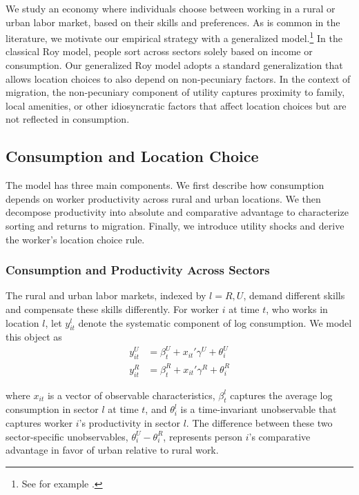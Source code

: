 \documentclass[12pt]{article}
\begin{document}
We study an economy where individuals choose between working in a rural or urban labor market, based on their skills and preferences. 
As is common in the literature, we motivate our empirical strategy with a generalized \cite{royThoughtsDistributionEarnings1951} model.\footnote{See for example \citealt{bazziSkillTransferabilityMigration2016, alvarezAgriculturalWageGap2020, lagakosSelectionAgricultureCrossCountry2013,pulidoBarriersMobilitySorting2021}.} 
In the classical Roy model, people sort across sectors solely based on income or consumption.
Our generalized Roy model adopts a standard generalization that allows location choices to also depend on non-pecuniary factors. 
In the context of migration, the non-pecuniary component of utility captures proximity to family, local amenities, or other idiosyncratic factors that affect location choices but are not reflected in consumption.

\subsection{Consumption and Location Choice}\label{location-choice-model}

The model has three main components.
We first describe how consumption depends on worker productivity across rural and urban locations.
We then decompose productivity into absolute and comparative advantage to characterize sorting and returns to migration.
Finally, we introduce utility shocks and derive the worker’s location choice rule.


\subsubsection{Consumption and Productivity Across Sectors}

The rural and urban labor markets, indexed by $l=R,U$, demand different skills and compensate these skills differently. 
For worker $i$ at time $t$, who works in location $l$, let $y_{it}^l$ denote the systematic component of log consumption.
We model this object as
\begin{align}
    y_{it}^{U}&=\beta_t^U+x_{it}'\gamma^U+\theta_i^U \label{eq:y_it_U}\\
    y_{it}^{R}&=\beta_t^R+x_{it}'\gamma^R+\theta_i^R \label{eq:y_it_R}
\end{align}

\noindent where $x_{i t}$ is a vector of observable characteristics, $\beta^{l}_{t}$ captures the average log consumption in sector $l$ at time $t$, and $\theta^{l}_{i}$ is a time-invariant unobservable that captures worker $i$'s productivity in sector $l$.
The difference between these two sector-specific unobservables, $\theta_{i}^U-\theta_{i}^R$, represents person $i$'s comparative advantage in favor of urban relative to rural work.
\end{document}
